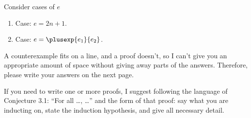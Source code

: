 \begin{enumerate}[(a)]
  Consider cases of $e$
  \begin{enumerate}
  \item Case: $e = 2n + 1$.\\
  \begin{llproof}
  \end{llproof}
  
  \item Case: $e = \plusexp{e_1}{e_2}$.\\
  \begin{llproof}
  \end{llproof}
  \end{enumerate}
\end{enumerate}

A counterexample fits on a line, and a proof doesn't, so I can't give you an appropriate
amount of space without giving away parts of the answers.
Therefore, please write your answers on the next page.

If you need to write one or more proofs, I suggest following the
language of Conjecture 3.1: ``For all \dots, \dots'' and the form of that proof:
say what you are inducting on, state the induction hypothesis, and give all necessary
detail.



